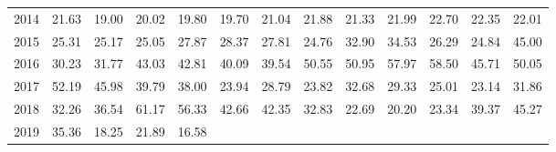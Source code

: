 \begin{longtable}{rrrrrrrrrrrrr}
  2014 & 21.63 & 19.00 & 20.02 & 19.80 & 19.70 & 21.04 & 21.88 & 21.33 & 21.99 & 22.70 & 22.35 & 22.01 \\ 
  2015 & 25.31 & 25.17 & 25.05 & 27.87 & 28.37 & 27.81 & 24.76 & 32.90 & 34.53 & 26.29 & 24.84 & 45.00 \\ 
  2016 & 30.23 & 31.77 & 43.03 & 42.81 & 40.09 & 39.54 & 50.55 & 50.95 & 57.97 & 58.50 & 45.71 & 50.05 \\ 
  2017 & 52.19 & 45.98 & 39.79 & 38.00 & 23.94 & 28.79 & 23.82 & 32.68 & 29.33 & 25.01 & 23.14 & 31.86 \\ 
  2018 & 32.26 & 36.54 & 61.17 & 56.33 & 42.66 & 42.35 & 32.83 & 22.69 & 20.20 & 23.34 & 39.37 & 45.27 \\ 
  2019 & 35.36 & 18.25 & 21.89 & 16.58 &  &  &  &  &  &  &  &  \\ 
   \hline
\hline
\end{longtable}
